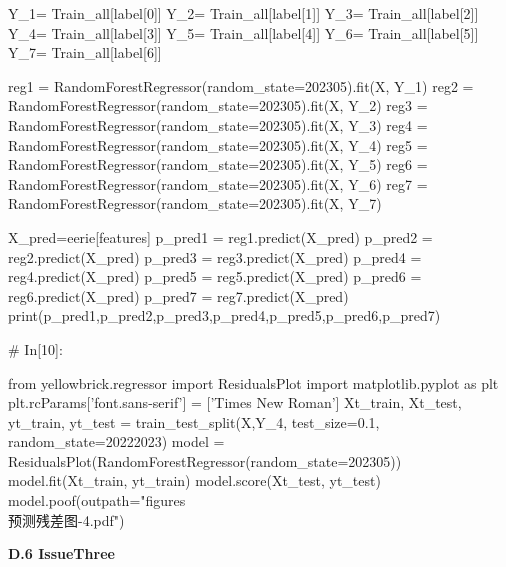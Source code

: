 \documentclass{MathModeling}
\begin{document}
\begin{python}
Y_1= Train_all[label[0]]
Y_2= Train_all[label[1]]
Y_3= Train_all[label[2]]
Y_4= Train_all[label[3]]
Y_5= Train_all[label[4]]
Y_6= Train_all[label[5]]
Y_7= Train_all[label[6]]

reg1 = RandomForestRegressor(random_state=202305).fit(X, Y_1)
reg2 = RandomForestRegressor(random_state=202305).fit(X, Y_2)
reg3 = RandomForestRegressor(random_state=202305).fit(X, Y_3)
reg4 = RandomForestRegressor(random_state=202305).fit(X, Y_4)
reg5 = RandomForestRegressor(random_state=202305).fit(X, Y_5)
reg6 = RandomForestRegressor(random_state=202305).fit(X, Y_6)
reg7 = RandomForestRegressor(random_state=202305).fit(X, Y_7)

X_pred=eerie[features]
p_pred1 = reg1.predict(X_pred)
p_pred2 = reg2.predict(X_pred)
p_pred3 = reg3.predict(X_pred)
p_pred4 = reg4.predict(X_pred)
p_pred5 = reg5.predict(X_pred)
p_pred6 = reg6.predict(X_pred)
p_pred7 = reg7.predict(X_pred)
print(p_pred1,p_pred2,p_pred3,p_pred4,p_pred5,p_pred6,p_pred7)


# In[10]:


from yellowbrick.regressor import ResidualsPlot
import matplotlib.pyplot as plt
plt.rcParams['font.sans-serif'] = ['Times New Roman']
Xt_train, Xt_test, yt_train, yt_test = train_test_split(X,Y_4, test_size=0.1, random_state=20222023)
model = ResidualsPlot(RandomForestRegressor(random_state=202305))
model.fit(Xt_train, yt_train)
model.score(Xt_test, yt_test)
model.poof(outpath="figures\\预测残差图-4.pdf")


\end{python}
\newpage
\textbf{D.6 IssueThree}
\end{document}
